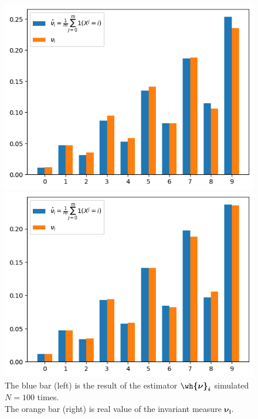 \begin{figure}[H]
    \centering
    \begin{minipage}[b]{0.49\textwidth}
        \centering
        \includegraphics[width=\textwidth]{../pictures/2.f.3.png}
        \caption*{$N = 100,\; T = 100$}
    \end{minipage}
    \hfill
    \begin{minipage}[b]{0.49\textwidth}
        \centering
        \includegraphics[width=\textwidth]{../pictures/2.f.4.png}
        \caption*{$N = 100,\; T = 1000$}
    \end{minipage}
    \caption*{The {\color{blue} blue bar (left)} is the result of the estimator {\color{blue}$\boldsymbol{\wh{\nu}_i}$} simulated $N=100$ times.\\ The {\color{red} orange bar (right)} is real value of the invariant measure {\color{red}$\boldsymbol{\nu_i}$}. }
\end{figure}
